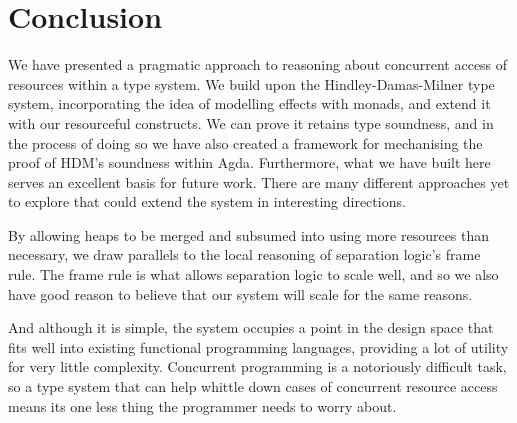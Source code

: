 \documentclass{report}
\begin{document}










\chapter{Conclusion}
We have presented a pragmatic approach to reasoning about concurrent access of
resources within a type system. We build upon the Hindley-Damas-Milner type
system, incorporating the idea of modelling effects with monads, and extend it
with our resourceful constructs. We can prove it retains type soundness, and in
the process of doing so we have also created a framework for mechanising the
proof of HDM's soundness within Agda.
Furthermore, what we have built here serves an excellent basis for future
work. There are many different approaches yet to explore that could extend the
system in interesting directions.

By allowing heaps to be merged and subsumed into using more resources than
necessary, we draw parallels to the local reasoning of separation logic's frame
rule. The frame rule is what allows separation logic to scale well, and so we also
have good reason to believe that our system will scale for the same reasons.

And although it is simple, the system occupies a point in the design space that
fits well into existing functional programming languages, providing a lot of
utility for very little complexity. Concurrent programming is a notoriously
difficult task, so a type system that can help whittle down cases of concurrent
resource access means its one less thing the programmer needs to worry about.





\end{document}
